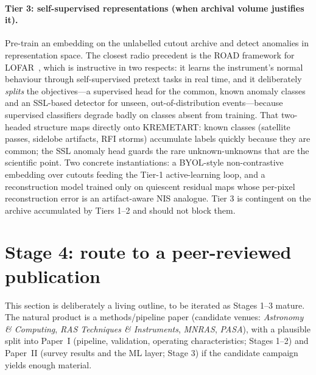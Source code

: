 \documentclass[11pt]{article}
\begin{document}
\paragraph{Tier 3: self-supervised representations (when archival volume justifies it).} Pre-train
an embedding on the unlabelled cutout archive and detect anomalies in representation space. The
closest radio precedent is the ROAD framework for LOFAR~\cite{mesarcik}, which is instructive in
two respects: it learns the instrument's normal behaviour through self-supervised pretext tasks in
real time, and it deliberately \emph{splits} the objectives---a supervised head for the common,
known anomaly classes and an SSL-based detector for unseen, out-of-distribution events---because
supervised classifiers degrade badly on classes absent from training. That two-headed structure
maps directly onto KREMETART: known classes (satellite passes, sidelobe artifacts, RFI storms)
accumulate labels quickly because they are common; the SSL anomaly head guards the rare
unknown-unknowns that are the scientific point. Two concrete instantiations: a BYOL-style
non-contrastive embedding over cutouts feeding the Tier-1 active-learning loop, and a
reconstruction model trained only on quiescent residual maps whose per-pixel reconstruction error
is an artifact-aware NIS analogue. Tier 3 is contingent on the archive accumulated by Tiers 1--2
and should not block them.

\section{Stage 4: route to a peer-reviewed publication}
\label{sec:stage4}

This section is deliberately a living outline, to be iterated as Stages 1--3 mature. The natural
product is a methods/pipeline paper (candidate venues: \emph{Astronomy \& Computing}, \emph{RAS
Techniques \& Instruments}, \emph{MNRAS}, \emph{PASA}), with a plausible split into Paper~I
(pipeline, validation, operating characteristics; Stages 1--2) and Paper~II (survey results and the
ML layer; Stage 3) if the candidate campaign yields enough material.
\end{document}
